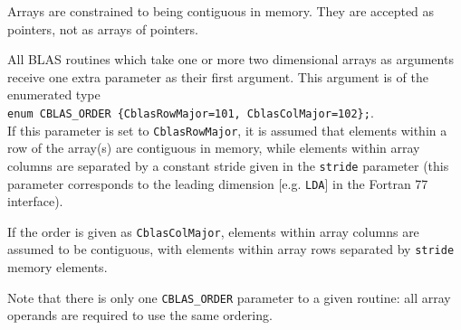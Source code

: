 \documentclass{article}
\begin{document}
Arrays are constrained to being contiguous in memory.  They
are accepted as pointers, not as arrays of pointers.  

All BLAS routines which take one or more two dimensional arrays as arguments
receive one extra parameter as their first argument.  This argument is
of the enumerated type \\
{\tt enum~CBLAS\_ORDER~\{CblasRowMajor=101,~CblasColMajor=102\};}.\\
If this parameter
is set to {\tt CblasRowMajor}, it is assumed that elements within a row of
the array(s) are contiguous in memory, while elements within array columns
are separated by a constant stride given in the {\tt stride} parameter (this
parameter corresponds to the leading dimension [e.g. {\tt LDA}] in the
Fortran 77 interface).

If the order is given as {\tt CblasColMajor}, elements within array columns
are assumed to be contiguous, with elements within array rows separated
by {\tt stride} memory elements.

Note that there is only one {\tt CBLAS\_ORDER} parameter
to a given routine: all array operands are required to use the same ordering.
\end{document}
